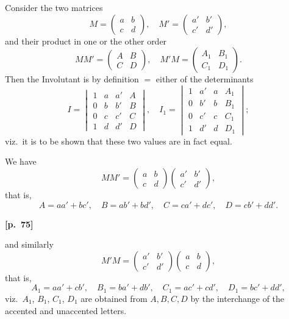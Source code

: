 \documentclass[11pt,a4paper]{article}
\theoremstyle{plain}
\begin{document}
Consider the two matrices
$$
M = \begin{pmatrix} a & b \\ c & d \end{pmatrix}, \quad M' = \begin{pmatrix} a' & b' \\ c' & d' \end{pmatrix},
$$
and their product in one or the other order
$$
MM' = \begin{pmatrix} A & B \\ C & D \end{pmatrix}, \quad M'M = \begin{pmatrix} A_1 & B_1 \\ C_1 & D_1 \end{pmatrix}.
$$
Then the Involutant is by definition $=$ either of the determinants
$$
I = \begin{vmatrix} 1 & a & a' & A \\ 0 & b & b' & B \\ 0 & c & c' & C \\ 1 & d & d' & D \end{vmatrix}, \quad
I_1 = \begin{vmatrix} 1 & a' & a & A_1 \\ 0 & b' & b & B_1 \\ 0 & c' & c & C_1 \\ 1 & d' & d & D_1 \end{vmatrix};
$$
viz.\ it is to be shown that these two values are in fact equal.

We have
$$
MM' = \begin{pmatrix} a & b \\ c & d \end{pmatrix} \begin{pmatrix} a' & b' \\ c' & d' \end{pmatrix},
$$
that is,
$$
A = aa' + bc', \quad B = ab' + bd', \quad C = ca' + dc', \quad D = cb' + dd'.
$$

\vspace{0.5em}
\noindent\textbf{[p.\ 75]}

and similarly
$$
M'M = \begin{pmatrix} a' & b' \\ c' & d' \end{pmatrix} \begin{pmatrix} a & b \\ c & d \end{pmatrix},
$$
that is,
$$
A_1 = aa' + cb', \quad B_1 = ba' + db', \quad C_1 = ac' + cd', \quad D_1 = bc' + dd',
$$
viz.\ $A_1$, $B_1$, $C_1$, $D_1$ are obtained from $A, B, C, D$ by the interchange of the accented and unaccented letters.
\end{document}
